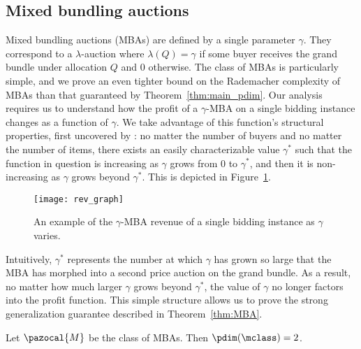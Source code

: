 \subsection{Mixed bundling auctions}\label{app:MBA}

Mixed bundling auctions (MBAs) are defined by a single parameter $\gamma$. They correspond to a $\lambda$-auction where $\lambda(Q) = \gamma$ if some buyer receives the grand bundle under allocation $Q$ and 0 otherwise. The class of MBAs is particularly simple, and we prove an even tighter bound on the Rademacher complexity of MBAs than that guaranteed by Theorem~\ref{thm:main_pdim}. Our analysis requires us to understand how the profit of a $\gamma$-MBA on a single bidding instance changes as a function of $\gamma$. We take advantage of this function's structural properties, first uncovered by \citet{Jehiel07:Mixed}: no matter the number of buyers and no matter the number of items, there exists an easily characterizable value $\gamma^*$ such that the function in question is increasing as $\gamma$ grows from 0 to $\gamma^*$, and then it is non-increasing as $\gamma$ grows beyond $\gamma^*$. This is depicted in Figure~\ref{fig:revGraphn}.
\begin{figure}
  \centering
  \texttt{[image: rev\_graph]}
  \caption{An example of the $\gamma$-MBA revenue of a single bidding instance as $\gamma$ varies.}
  \label{fig:revGraphn}
\end{figure}
Intuitively, $\gamma^*$ represents the number at which $\gamma$ has grown so large that the MBA has morphed into a second price auction on the grand bundle. As a result, no matter how much larger $\gamma$ grows beyond $\gamma^*$, the value of $\gamma$ no longer factors into the profit function. This simple structure allows us to prove the strong generalization guarantee described in Theorem~\ref{thm:MBA}.

\begin{theorem}\label{thm:MBA}
Let $\pazocal{M}$ be the class of MBAs. Then $\pdim(\mclass) = 2$.
\end{theorem}

